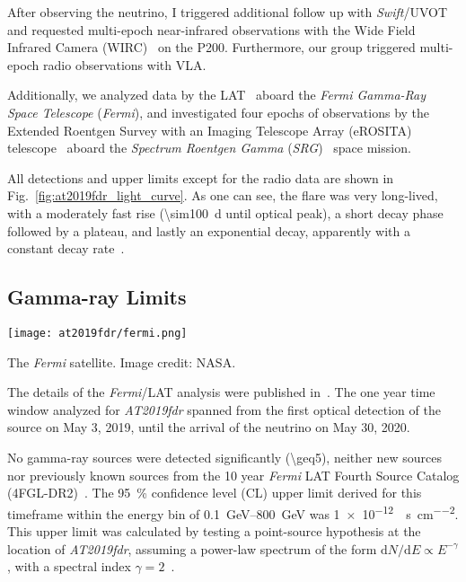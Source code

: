 After observing the neutrino, I triggered additional follow up with \textit{Swift}/UVOT and requested multi-epoch near-infrared observations with the Wide Field Infrared Camera (WIRC)~ on the P200. Furthermore, our group triggered multi-epoch radio observations with VLA.

Additionally, we analyzed data by the LAT~\cite{Atwood2009} aboard the \textit{Fermi Gamma-Ray Space Telescope} (\textit{Fermi}), and investigated four epochs of observations by the Extended Roentgen Survey with an Imaging Telescope Array (eROSITA) telescope~ aboard the \textit{Spectrum Roentgen Gamma} (\textit{SRG})~ space mission.

All detections and upper limits except for the radio data are shown in Fig.~\ref{fig:at2019fdr_light_curve}. As one can see, the flare was very long-lived, with a moderately fast rise (\SI{\sim100}{\day} until optical peak), a short decay phase followed by a plateau, and lastly an exponential decay, apparently with a constant decay rate~.

\subsection{Gamma-ray Limits}

\begin{marginfigure}
    \texttt{[image: at2019fdr/fermi.png]}
    \caption[The \textit{Fermi} satellite]{The \textit{Fermi} satellite. Image credit: NASA.}
\end{marginfigure}

The details of the \textit{Fermi}/LAT analysis were published in~. The one year time window analyzed for \emph{AT2019fdr} spanned from the first optical detection of the source on May 3, 2019, until the arrival of the neutrino on May 30, 2020.

No gamma-ray sources were detected significantly (\SI{\geq5}{\sigma}), neither new sources nor previously known sources from the 10 year \textit{Fermi} LAT Fourth Source Catalog (4FGL-DR2)~. The \SI{95}{\percent} confidence level (CL) upper limit derived for this timeframe within the energy bin of \SIrange{0.1}{800}{\giga\eV} was \SI{1e-12}{\erg\per\s\per\square\cm}. This upper limit was calculated by testing a point-source hypothesis at the location of \emph{AT2019fdr}, assuming a power-law spectrum of the form $\text{d}N/\text{d}E \propto E^{-\gamma}$, with a spectral index $\gamma=2$~\cite{Velzen2021}.

